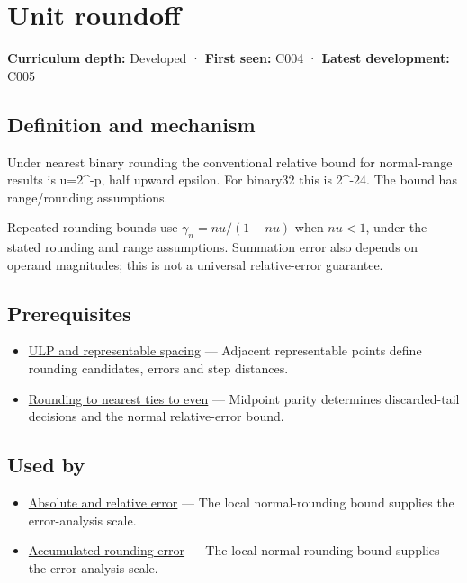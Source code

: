 \hypertarget{appendix-bc44f7b42f42}{}\label{referencestart:appendix-bc44f7b42f42}
\section{Unit roundoff}\label{appendix-bc44f7b42f42-unit-roundoff}

\textbf{Curriculum depth:} Developed · \textbf{First seen:} C004 · \textbf{Latest development:} C005

\subsection{Definition and mechanism}\label{appendix-bc44f7b42f42-definition-and-mechanism}

Under nearest binary rounding the conventional relative bound for normal-range results is u=2\^{}-p, half upward epsilon. For binary32 this is 2\^{}-24. The bound has range/rounding assumptions.

Repeated-rounding bounds use \(\gamma_n=nu/(1-nu)\) when \(nu<1\), under the stated rounding and range assumptions. Summation error also depends on operand magnitudes; this is not a universal relative-error guarantee.

\subsection{Prerequisites}\label{appendix-bc44f7b42f42-prerequisites}

\begin{itemize}
\tightlist
\item
  \hyperref[appendix-14bab4cab9d4]{ULP and representable spacing} --- Adjacent representable points define rounding candidates, errors and step distances.
\item
  \hyperref[appendix-614afe1de592]{Rounding to nearest ties to even} --- Midpoint parity determines discarded-tail decisions and the normal relative-error bound.
\end{itemize}

\subsection{Used by}\label{appendix-bc44f7b42f42-used-by}

\begin{itemize}
\tightlist
\item
  \hyperref[appendix-3ae74e89b4e6]{Absolute and relative error} --- The local normal-rounding bound supplies the error-analysis scale.
\item
  \hyperref[appendix-f82e270791c8]{Accumulated rounding error} --- The local normal-rounding bound supplies the error-analysis scale.
\end{itemize}

